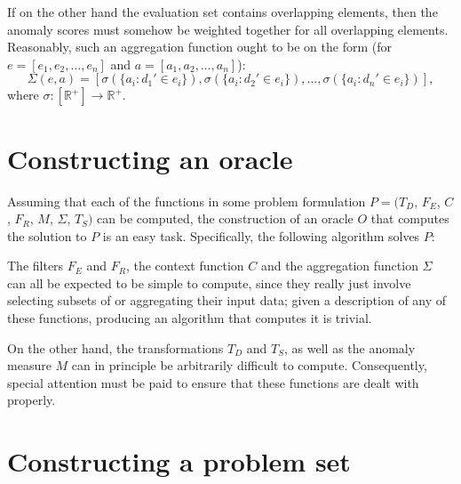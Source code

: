 If on the other hand the evaluation set contains overlapping elements, then the anomaly scores must somehow be weighted together for all overlapping elements. Reasonably, such an aggregation function ought to be on the form (for $e = [e_1, e_2, \dots, e_n]$ and $a = [a_1, a_2, \dots, a_n]$):
\[
    \Sigma(e, a) = [\sigma(\{a_i : d_1' \in e_i\}), \sigma(\{a_i : d_2' \in e_i\}), \dots, \sigma(\{a_i : d_n' \in e_i\})],
\]
where $\sigma: [\mathbb{R}^+] \rightarrow \mathbb{R}^+$.

\section{Constructing an oracle}
\label{sect:oracle}

Assuming that each of the functions in some problem formulation $P = (T_D$, $F_E$, $C$, $F_R$, $M$, $\Sigma$, $T_S)$ can be computed, the construction of an oracle $O$ that computes the solution to $P$ is an easy task. Specifically, the following algorithm solves $P$:

\begin{algorithmic}
     
    \EndFor{}
\end{algorithmic}

The filters $F_E$ and $F_R$, the context function $C$ and the aggregation function $\Sigma$ can all be expected to be simple to compute, since they really just involve selecting subsets of or aggregating their input data; given a description of any of these functions, producing an algorithm that computes it is trivial.

On the other hand, the transformations $T_D$ and $T_S$, as well as the anomaly measure $M$ can in principle be arbitrarily difficult to compute. Consequently, special attention must be paid to ensure that these functions are dealt with properly.

\section{Constructing a problem set}

